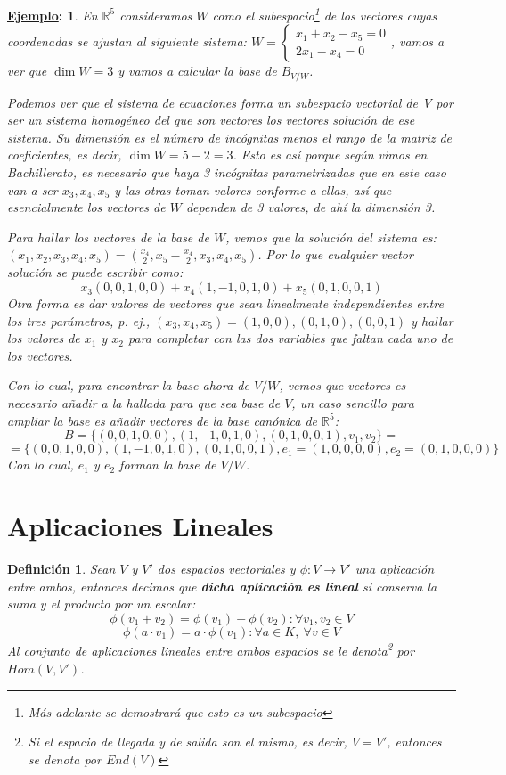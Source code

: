 \documentclass[10pt,a4paper,openright]{book}
\theoremstyle{break}
\newtheorem*{defi}{Definición}
\newtheorem*{ej}{\underline{Ejemplo}:}
\begin{document}
\begin{ej}
En $\mathbb R^5$ consideramos $W$ como el subespacio\footnote{Más adelante se demostrará que esto es un subespacio} de los vectores cuyas coordenadas se ajustan al siguiente sistema: $W=\begin{cases}
x_1+x_2-x_5=0 \\
2x_1-x_4=0
\end{cases}$, vamos a ver que $\dim W=3$ y vamos a calcular la base de $B_{V/W}$.

Podemos ver que el sistema de ecuaciones forma un subespacio vectorial de V por ser un sistema homogéneo del que son vectores los vectores solución de ese sistema. Su dimensión es el número de incógnitas menos el rango de la matriz de coeficientes, es decir, $\dim W=5-2=3$. Esto es así porque según vimos en Bachillerato, es necesario que haya 3 incógnitas parametrizadas que en este caso van a ser $x_3, x_4, x_5$ y las otras toman valores conforme a ellas, así que esencialmente los vectores de $W$ dependen de 3 valores, de ahí la dimensión 3.

Para hallar los vectores de la base de $W$, vemos que la solución del sistema es: $(x_1,x_2,x_3,x_4,x_5)=(\frac{x_4}{2}, x_5-\frac{x_4}{2},x_3,x_4,x_5)$. Por lo que cualquier vector solución se puede escribir como:
$$x_3(0,0,1,0,0)+x_4(1,-1,0,1,0)+x_5(0,1,0,0,1)$$
Otra forma es dar valores de vectores que sean linealmente independientes entre los tres parámetros, p. ej., $(x_3,x_4,x_5)=(1,0,0),(0,1,0), (0,0,1)$ y hallar los valores de $x_1$ y $x_2$ para completar con las dos variables que faltan cada uno de los vectores.\par
Con lo cual, para encontrar la base ahora de $V/W$, vemos que  vectores es necesario añadir a la hallada para que sea base de $V$, un caso sencillo para ampliar la base es añadir vectores de la base canónica de $\mathbb R^5$:
$$B=\{(0,0,1,0,0),(1,-1,0,1,0),(0,1,0,0,1), v_1, v_2\}=$$
$$=\{(0,0,1,0,0),(1,-1,0,1,0),(0,1,0,0,1), e_1=(1,0,0,0,0), e_2=(0,1,0,0,0)\}$$
Con lo cual, $e_1$ y $e_2$ forman la base de $V/W$.
\end{ej}

\section{Aplicaciones Lineales}
\begin{defi}
Sean $V$ y $V'$ dos espacios vectoriales y $\phi:V\longrightarrow V'$ una aplicación entre ambos, entonces decimos que \textbf{dicha aplicación es lineal} si conserva la suma y el producto por un escalar:
$$\phi(v_1+v_2)=\phi(v_1)+\phi(v_2): \forall v_1,v_2\in V$$
$$\phi(a\cdot v_1)=a\cdot \phi(v_1): \forall a\in K,\ \forall v\in V$$
Al conjunto de aplicaciones lineales entre ambos espacios se le denota\footnote{Si el espacio de llegada y de salida son el mismo, es decir, $V=V'$, entonces se denota por $End(V)$} por $Hom(V,V')$.
\end{defi}
\end{document}
